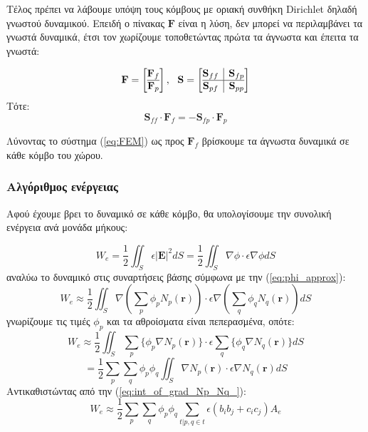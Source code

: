 \documentclass[10pt, letterpaper]{article}
\newcommand{\en}{\selectlanguage{english}}
\newcommand{\gr}{\selectlanguage{greek}}
\begin{document}
Τέλος πρέπει να λάβουμε υπόψη τους κόμβους με οριακή συνθήκη \en Dirichlet \gr δηλαδή γνωστού δυναμικού. Επειδή ο πίνακας $\mathbf{F}$ είναι η λύση,
δεν μπορεί να περιλαμβάνει τα γνωστά δυναμικά, έτσι τον χωρίζουμε τοποθετώντας πρώτα τα άγνωστα και έπειτα τα γνωστά:

\[
\mathbf{F} = 
\left[ \begin{array}{@{}c@{}}
\mathbf{F}_f \\
\hline
\mathbf{F}_p
\end{array} \right]
, \ \
\mathbf{S} = 
\left[ \begin{array}{@{}c|c@{}}
  \mathbf{S}_{ff} & \mathbf{S}_{fp} \\
  \hline
  \mathbf{S}_{pf} & \mathbf{S}_{pp}
  \end{array} \right]
\]
Τότε:
\begin{equation}   \label{eq:FEM}
  \mathbf{S}_{ff} \cdot \mathbf{F}_f = - \mathbf{S}_{fp} \cdot \mathbf{F}_p
\end{equation}

Λύνοντας το σύστημα (\ref{eq:FEM}) ως προς $\mathbf{F}_f$ βρίσκουμε τα άγνωστα δυναμικά σε κάθε κόμβο του χώρου.




\subsubsection*{Αλγόριθμος ενέργειας}

Αφού έχουμε βρει το δυναμικό σε κάθε κόμβο, θα υπολογίσουμε την συνολική ενέργεια ανά μονάδα μήκους:

\begin{equation}   \label{eq:We}
  W_e = \frac{1}{2} \iint_S \epsilon |\mathbf{E}|^2dS = \frac{1}{2} \iint_S  \nabla \phi  \cdot \epsilon \nabla \phi dS
\end{equation}
αναλύω το δυναμικό στις συναρτήσεις βάσης σύμφωνα με την (\ref{eq:phi_approx}):
\[W_e \approx \frac{1}{2} \iint_S \nabla (\sum_p \phi_p N_p(\mathbf{r}))  \cdot \epsilon  \nabla (\sum_q \phi_q N_q(\mathbf{r})) dS\]
γνωρίζουμε τις τιμές $\phi_p$ και τα αθροίσματα είναι πεπερασμένα, οπότε:
\[ W_e \approx  \frac{1}{2}  \iint_S  \sum_p \{ \phi_p \nabla N_p(\mathbf{r}) \} \cdot  \epsilon \sum_q \{ \phi_q \nabla N_q(\mathbf{r}) \} dS\]
\[ = \frac{1}{2}   \sum_p \sum_q  \phi_p \phi_q \iint_S \nabla N_p(\mathbf{r})  \cdot \epsilon \nabla N_q(\mathbf{r})  dS \]
Αντικαθιστώντας από την (\ref{eq:int_of_grad_Np_Nq_}):
\[ W_e \approx \frac{1}{2}  \sum_p \sum_{q}  \phi_p \phi_q   \sum_{t | p,q \in t} \epsilon  (b_ib_j + c_ic_j) A_e  \]
\end{document}
